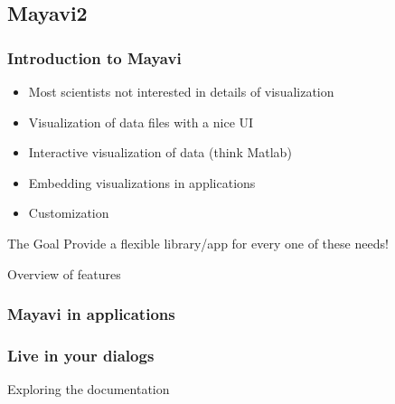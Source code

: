 \documentclass[compress,14pt]{beamer}
\begin{document}
\subsection{Mayavi2}

\begin{frame}
  \frametitle{Introduction to Mayavi}
  \begin{itemize}
  \item Most scientists not interested in details of visualization
  \item Visualization of data files with a nice UI
  \item Interactive visualization of data (think Matlab)
  \item Embedding visualizations in applications
  \item Customization
  \end{itemize}
  \pause
  \begin{block}{The Goal}
      Provide a \alert{flexible} library/app for every one of these needs!
  \end{block}
\end{frame}

\begin{frame}
    {Overview of features}
      \vspace*{-0.3in}
  \begin{center}    
    \hspace*{-0.2in}
  \end{center}    
\end{frame}


\begin{frame}
    \frametitle{Mayavi in applications}
      \vspace*{-0.3in}
  \begin{center}    
    \hspace*{-0.2in}
  \end{center}
\end{frame}

\begin{frame}
    \frametitle{Live in your dialogs}
      \vspace*{0.1in}
  \begin{center}    
    \hspace*{-0.2in}
  \end{center}
\end{frame}

\begin{frame}
    {Exploring the documentation}
    \begin{center}
    \end{center}
\end{frame}
\end{document}
